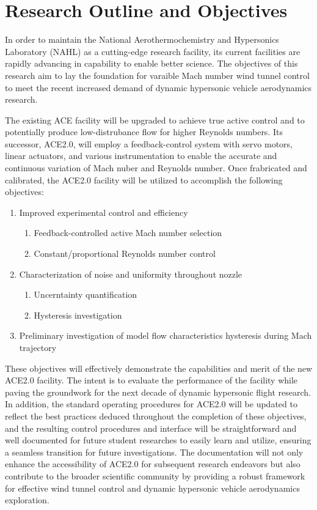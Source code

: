 \section{Research Outline and Objectives}

In order to maintain the National Aerothermochemistry and Hypersonics Laboratory (NAHL) as a cutting-edge research facility, its current facilities are rapidly advancing in capability to enable better science. The objectives of this research aim to lay the foundation for varaible Mach number wind tunnel control to meet the recent increased demand of dynamic hypersonic vehicle aerodynamics research.

The existing ACE facility will be upgraded to achieve true active control and to potentially produce low-distrubance flow for higher Reynolds numbers. Its successor, ACE2.0, will employ a feedback-control system with servo motors, linear actuators, and various instrumentation to enable the accurate and continuous variation of Mach nuber and Reynolds number. Once frabricated and calibrated, the ACE2.0 facility will be utilized to accomplish the following objectives:

\begin{enumerate}
    \item Improved experimental control and efficiency
        \begin{enumerate}
            \item Feedback-controlled active Mach number selection
            \item Constant/proportional Reynolds number control
        \end{enumerate}
    \item Characterization of noise and uniformity throughout nozzle
        \begin{enumerate}
            \item Uncerntainty quantification
            \item Hysteresis investigation
        \end{enumerate}
    \item Preliminary investigation of model flow characteristics hysteresis during Mach trajectory
\end{enumerate}

These objectives will effectively demonstrate the capabilities and merit of the new ACE2.0 facility. The intent is to evaluate the performance of the facility while paving the groundwork for the next decade of dynamic hypersonic flight research. In addition, the standard operating procedures for ACE2.0 will be updated to reflect the best practices deduced throughout the completion of these objectives, and the resulting control procedures and interface will be straightforward and well documented for future student researches to easily learn and utilize, ensuring a seamless transition for future investigations. The documentation will not only enhance the accessibility of ACE2.0 for subsequent research endeavors but also contribute to the broader scientific community by providing a robust framework for effective wind tunnel control and dynamic hypersonic vehicle aerodynamics exploration.

